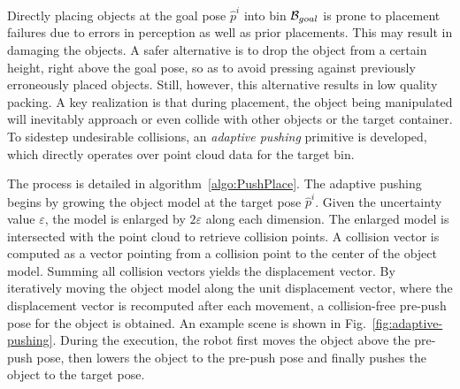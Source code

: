 
Directly placing objects at the goal pose $\hat{p}^i$ into bin $\mathcal{B}_{goal}$ is prone to placement failures due to errors in perception as well as prior placements. This may result in damaging the objects. A safer alternative is to drop the object from a certain height, right above the goal pose, so as to avoid pressing against previously erroneously placed objects. Still, however, this alternative results in low quality packing. A key realization is that during placement, the object being manipulated will inevitably approach or even collide with other objects or the target container. To sidestep undesirable collisions, an {\em adaptive pushing} primitive is developed, which directly operates over point cloud data for the target bin. 


The process is detailed in algorithm~\ref{algo:PushPlace}. The adaptive pushing begins by growing the object model at the target pose $\hat{p}^i$. Given the uncertainty value $\varepsilon$, the model is enlarged by  $2\varepsilon$ along each dimension. The enlarged model is intersected with the point cloud to retrieve collision points. A collision vector is computed as a vector pointing from a collision point to the center of the object model. Summing all collision vectors yields the displacement vector. By iteratively moving the object model along the unit displacement vector, where the displacement vector is recomputed after each movement, a collision-free pre-push pose for the object is obtained. An example scene is shown in Fig.~\ref{fig:adaptive-pushing}. During the execution, the robot first moves the object above the pre-push pose, then lowers the object to the pre-push pose and finally pushes the object to the target pose. 

